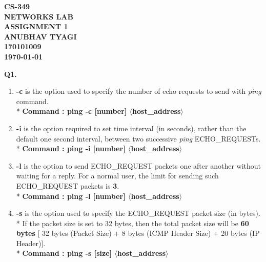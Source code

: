 \documentclass[12pt]{report}
\begin{document}
	\newlength{\strutheight}
	\settoheight{\strutheight}{\strut}
	\begin{titlepage}
		\begin{center}
			\hspace{0pt}
			\vfill
			\Huge{\textbf{CS-349\\ \vspace*{10px} NETWORKS LAB}}\\
			\vspace*{30px}
			\Huge{\textbf{ASSIGNMENT 1}}\\
			\vspace*{70px}
			\Large{\textbf{ANUBHAV TYAGI}}\\
			\Large{\textbf{170101009}}\\
			\vspace*{10px}
			\Large{\textbf{\today}}
			\vfill
			\hspace{0pt}
		\end{center}
	\end{titlepage}
	
	\newpage
	\vspace*{40px}
	\setlength{\parindent}{0em}
	\large{\textbf{Q1. }}
	\linebreak[1]
	\normalsize{}
	\renewcommand{\baselinestretch}{0.2}
	\begin{enumerate}[label=\textbf{(\alph*)}]
		\item \textbf{-c} is the option used to specify the number of echo requests to send with \textit{ping} command.\\* \textbf{Command : ping -c [number] $\boldsymbol{\langle}$host\_address$\boldsymbol{\rangle}$}
		\item \textbf{-i} is the option required to set time interval (in seconds), rather than the default one second interval, between two successive \textit{ping} ECHO\_REQUESTs.\\* \textbf{Command : ping -i [number] $\boldsymbol{\langle}$host\_address$\boldsymbol{\rangle}$}
		\item \textbf{-l} is the option to send ECHO\_REQUEST packets one after another without waiting for a reply. For a normal user, the limit for sending such ECHO\_REQUEST packets is \textbf{3}.\\* \textbf{Command : ping -l [number] $\boldsymbol{\langle}$host\_address$\boldsymbol{\rangle}$}
		\item \textbf{-s} is the option used to specify the ECHO\_REQUEST packet size (in bytes).\\*
		If the packet size is set to 32 bytes, then the total packet size will be \textbf{60 bytes} [ 32 bytes (Packet Size) + 8 bytes (ICMP Header Size) + 20 bytes (IP Header)].
		\\* \textbf{Command : ping -s [size] $\boldsymbol{\langle}$host\_address$\boldsymbol{\rangle}$}
	\end{enumerate}
	
\end{document}
